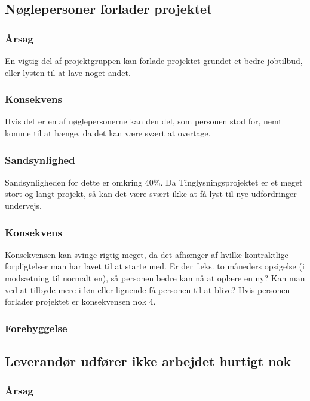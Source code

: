\documentclass[10pt,a4paper,danish]{article}
\begin{document}
\subsection{Nøglepersoner forlader projektet}
\subsubsection{Årsag}
En vigtig del af projektgruppen kan forlade projektet grundet et bedre jobtilbud, eller lysten til at lave noget andet.

\subsubsection{Konsekvens}
Hvis det er en af nøglepersonerne kan den del, som personen stod for, nemt komme til at hænge, da det kan være svært at overtage. 

\subsubsection{Sandsynlighed}
Sandsynligheden for dette er omkring 40\%. Da Tinglysningsprojektet er et meget stort og langt projekt, så kan det være svært ikke at få lyst til nye udfordringer undervejs.

\subsubsection{Konsekvens}
Konsekvensen kan svinge rigtig meget, da det afhænger af hvilke kontraktlige forpligtelser man har lavet til at starte med. Er der f.eks. to måneders opsigelse (i modsætning til normalt en), så personen bedre kan nå at oplære en ny? Kan man ved at tilbyde mere i løn eller lignende få personen til at blive? Hvis personen forlader projektet er konsekvensen nok 4.

\subsubsection{Forebyggelse}




\subsection{Leverandør udfører ikke arbejdet hurtigt nok}
\subsubsection{Årsag}
\end{document}
